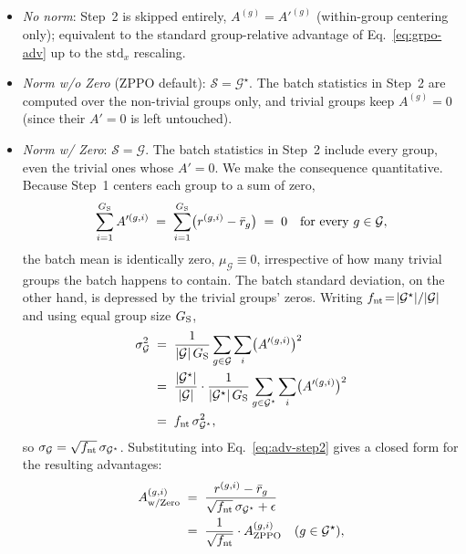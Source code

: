 \documentclass{llmxive}
\begin{document}
\begin{itemize}[leftmargin=12pt,topsep=2pt,itemsep=2pt]
  \item \emph{No norm}: Step~2 is skipped entirely, $A^{(g)}\!=\!A'^{(g)}$ (within-group centering only); equivalent to the standard group-relative advantage of Eq.~\eqref{eq:grpo-adv} up to the $\mathrm{std}_x$ rescaling.
  \item \emph{Norm w/o Zero} (ZPPO default): $\mathcal{S}\!=\!\mathcal{G}^{\star}$. The batch statistics in Step~2 are computed over the non-trivial groups only, and trivial groups keep $A^{(g)}\!=\!0$ (since their $A'\!=\!0$ is left untouched).
  \item \emph{Norm w/ Zero}: $\mathcal{S}\!=\!\mathcal{G}$. The batch statistics in Step~2 include every group, even the trivial ones whose $A'\!=\!0$. We make the consequence quantitative. Because Step~1 centers each group to a sum of zero,
  \begin{equation}
  \sum_{i=1}^{G_{\rm S}} A'^{(g,i)} \;=\; \sum_{i=1}^{G_{\rm S}} \bigl(r^{(g,i)}-\bar{r}_g\bigr) \;=\; 0 \quad \text{for every } g\in\mathcal{G},
  \label{eq:groupsum-zero}
  \end{equation}
  the batch mean is identically zero, $\mu_{\mathcal{G}}\!\equiv\!0$, irrespective of how many trivial groups the batch happens to contain. The batch standard deviation, on the other hand, is depressed by the trivial groups' zeros. Writing $f_{\rm nt}\!=\!|\mathcal{G}^{\star}|/|\mathcal{G}|$ and using equal group size $G_{\rm S}$,
  \begin{align}
  \sigma_{\mathcal{G}}^{2}
    &\;=\; \frac{1}{|\mathcal{G}|\,G_{\rm S}} \sum_{g\in\mathcal{G}}\sum_{i} \bigl(A'^{(g,i)}\bigr)^{2} \nonumber \\
    &\;=\; \frac{|\mathcal{G}^{\star}|}{|\mathcal{G}|}\cdot\frac{1}{|\mathcal{G}^{\star}|\,G_{\rm S}}\sum_{g\in\mathcal{G}^{\star}}\sum_{i} \bigl(A'^{(g,i)}\bigr)^{2} \nonumber \\
    &\;=\; f_{\rm nt}\,\sigma_{\mathcal{G}^{\star}}^{2},
  \label{eq:sigma-shrink}
  \end{align}
  so $\sigma_{\mathcal{G}}=\sqrt{f_{\rm nt}}\,\sigma_{\mathcal{G}^{\star}}$. Substituting into Eq.~\eqref{eq:adv-step2} gives a closed form for the resulting advantages:
  \begin{align}
  A^{(g,i)}_{\text{w/Zero}}
    &\;=\; \frac{r^{(g,i)}-\bar{r}_g}{\sqrt{f_{\rm nt}}\,\sigma_{\mathcal{G}^{\star}}+\epsilon} \nonumber \\
    &\;=\; \frac{1}{\sqrt{f_{\rm nt}}}\cdot A^{(g,i)}_{\text{ZPPO}} \quad (g\in\mathcal{G}^{\star}), \nonumber \\

\end{align}
\end{itemize}
\end{document}
